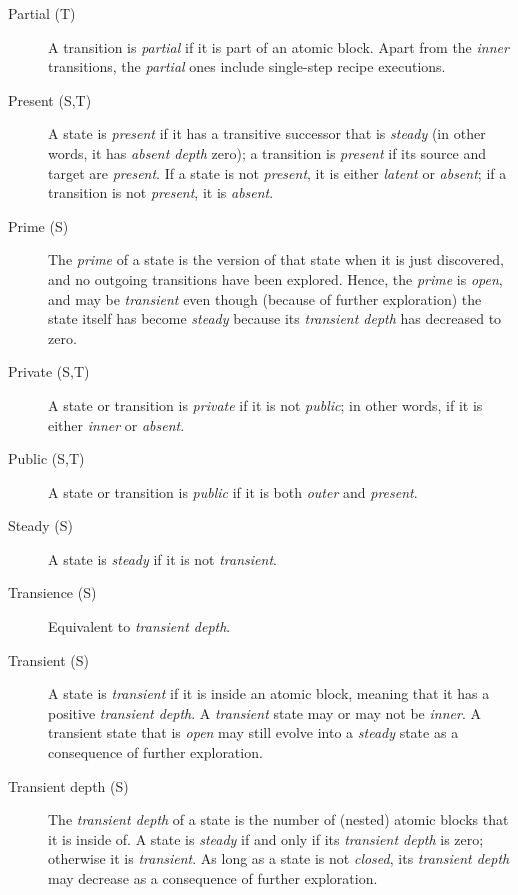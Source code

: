 \documentclass{article}
\begin{document}
\begin{description}
\item[Partial (T)] A transition is \emph{partial} if it is part of an atomic block. Apart from the \emph{inner} transitions, the \emph{partial} ones include single-step recipe executions.

\item[Present (S,T)] A state is \emph{present} if it has a transitive successor that is \emph{steady} (in other words, it has \emph{absent depth} zero); a transition is \emph{present} if its source and target are \emph{present}. If a state is not \emph{present}, it is either \emph{latent} or \emph{absent}; if a transition is not \emph{present}, it is \emph{absent}.

\item[Prime (S)] The \emph{prime} of a state is the version of that state when it is just discovered, and no outgoing transitions have been explored. Hence, the \emph{prime} is \emph{open}, and may be \emph{transient} even though (because of further exploration) the state itself has become \emph{steady} because its \emph{transient depth} has decreased to zero.

\item[Private (S,T)] A state or transition is \emph{private} if it is not \emph{public}; in other words, if it is either \emph{inner} or \emph{absent}.

\item[Public (S,T)] A state or transition is \emph{public} if it is both \emph{outer} and \emph{present}.

\item[Steady (S)] A state is \emph{steady} if it is not \emph{transient}.

\item[Transience (S)] Equivalent to \emph{transient depth}.

\item[Transient (S)] A state is \emph{transient} if it is inside an atomic block, meaning that it has a positive \emph{transient depth}. A \emph{transient} state may or may not be \emph{inner}. A transient state that is \emph{open} may still evolve into a \emph{steady} state as a consequence of further exploration.

\item[Transient depth (S)] The \emph{transient depth} of a state is the number of (nested) atomic blocks that it is inside of. A state is \emph{steady} if and only if its \emph{transient depth} is zero; otherwise it is \emph{transient}. As long as a state is not \emph{closed}, its \emph{transient depth} may decrease as a consequence of further exploration.
\end{description}
\end{document}
